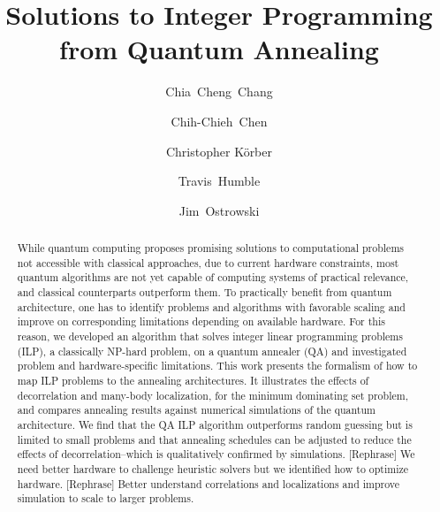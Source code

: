 \documentclass[prd,twocolumn,tightenlines,preprintnumbers,showpacs,superscriptaddress,notitlepage,nofootinbib,eqsecnum,floatfix,longbibliography]{revtex4}
\begin{document}
\title{Solutions to Integer Programming from Quantum Annealing}

\author{Chia~Cheng~Chang}
\author{Chih-Chieh~Chen}
\author{Christopher K\"orber}
\author{Travis~Humble}
\author{Jim~Ostrowski}

\begin{abstract}
While quantum computing proposes promising solutions to computational problems not accessible with classical approaches, due to current hardware constraints, most quantum algorithms are not yet capable of computing systems of practical relevance, and classical counterparts outperform them.
To practically benefit from quantum architecture, one has to identify problems and algorithms with favorable scaling and improve on corresponding limitations depending on available hardware.
For this reason, we developed an algorithm that solves integer linear programming problems (ILP), a classically NP-hard problem, on a quantum annealer (QA) and investigated problem and hardware-specific limitations.
This work presents the formalism of how to map ILP problems to the annealing architectures.
It illustrates the effects of decorrelation and many-body localization, for the minimum dominating set problem, and compares annealing results against numerical simulations of the quantum architecture.
We find that the QA ILP algorithm outperforms random guessing but is limited to small problems and that annealing schedules can be adjusted to reduce the effects of decorrelation--which is qualitatively confirmed by simulations.
[Rephrase] We need better hardware to challenge heuristic solvers but we identified how to optimize hardware.
[Rephrase] Better understand correlations and localizations and improve simulation to scale to larger problems.

\end{abstract}
\end{document}
